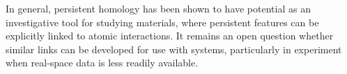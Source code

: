 In general, persistent homology has been shown to have potential as an investigative tool for studying \td{} materials, where persistent features can be explicitly linked to atomic interactions.
It remains an open question whether similar links can be developed for use with \thd{} systems, particularly in experiment when real\--space data is less readily available.
